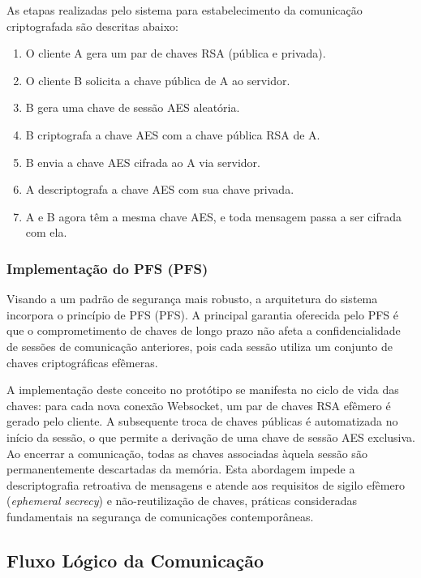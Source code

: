 As etapas realizadas pelo sistema para estabelecimento da comunicação
criptografada são descritas abaixo:

\begin{enumerate}
  \item O cliente A gera um par de chaves \acs{RSA} (pública e privada).
  \item O cliente B solicita a chave pública de A ao servidor.
  \item B gera uma chave de sessão \acs{AES} aleatória.
  \item B criptografa a chave \acs{AES} com a chave pública \acs{RSA} de A.
  \item B envia a chave \acs{AES} cifrada ao A via servidor.
  \item A descriptografa a chave \acs{AES} com sua chave privada.
  \item A e B agora têm a mesma chave \acs{AES}, e toda mensagem passa a
    ser cifrada com ela.
\end{enumerate}

\subsubsection{Implementação do \acl{PFS} (\acs{PFS})}

Visando a um padrão de segurança mais robusto, a arquitetura do
sistema incorpora o princípio de \acl{PFS} (\acs{PFS}). A
principal garantia oferecida pelo \acs{PFS} é que o comprometimento de
chaves de longo prazo não afeta a confidencialidade de sessões de
comunicação anteriores, pois cada sessão utiliza um conjunto de
chaves criptográficas efêmeras.

A implementação deste conceito no protótipo se manifesta no ciclo de
vida das chaves: para cada nova conexão Websocket, um par de chaves
\acs{RSA} efêmero é gerado pelo cliente. A subsequente troca de chaves
públicas é automatizada no início da sessão, o que permite a
derivação de uma chave de sessão \acs{AES} exclusiva. Ao encerrar a
comunicação, todas as chaves associadas àquela sessão são
permanentemente descartadas da memória. Esta abordagem impede a
descriptografia retroativa de mensagens e atende aos requisitos de
sigilo efêmero (\textit{ephemeral secrecy}) e não-reutilização de chaves,
práticas consideradas fundamentais na segurança de comunicações contemporâneas.

\subsection{Fluxo Lógico da Comunicação}

